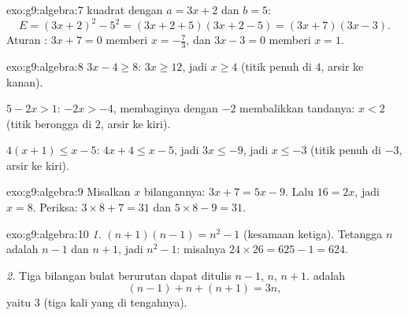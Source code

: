 \begin{solution}{exo:g9:algebra:7}
 kuadrat dengan $a = 3x + 2$ dan $b = 5$:
\[
E = (3x + 2)^2 - 5^2 = (3x + 2 + 5)(3x + 2 - 5) = (3x + 7)(3x - 3).
\]
Aturan  : $3x + 7 = 0$ memberi $x = -\frac73$, dan
$3x - 3 = 0$ memberi $x = 1$.
\end{solution}

\begin{solution}{exo:g9:algebra:8}
$3x - 4 \geq 8$: $3x \geq 12$, jadi $x \geq 4$ (titik penuh di $4$,
arsir ke kanan).

$5 - 2x > 1$: $-2x > -4$, membaginya dengan $-2$ membalikkan tandanya:
$x < 2$ (titik berongga di $2$, arsir ke kiri).

$4(x+1) \leq x - 5$: $4x + 4 \leq x - 5$, jadi $3x \leq -9$, jadi
$x \leq -3$ (titik penuh di $-3$, arsir ke kiri).
\end{solution}

\begin{solution}{exo:g9:algebra:9}
Misalkan $x$ bilangannya: $3x + 7 = 5x - 9$. Lalu $16 = 2x$, jadi
$x = 8$. Periksa: $3 \times 8 + 7 = 31$ dan $5 \times 8 - 9 = 31$.
\end{solution}

\begin{solution}{exo:g9:algebra:10}
\emph{1.} $(n+1)(n-1) = n^2 - 1$ (kesamaan ketiga). Tetangga $n$
adalah $n - 1$ dan $n + 1$, jadi  $n^2 - 1$: misalnya
$24 \times 26 = 625 - 1 = 624$.

\emph{2.} Tiga bilangan bulat berurutan dapat ditulis $n - 1$, $n$,
$n + 1$.  adalah
\[
(n-1) + n + (n+1) = 3n ,
\]
yaitu  $3$ (tiga kali yang di tengahnya).
\end{solution}

